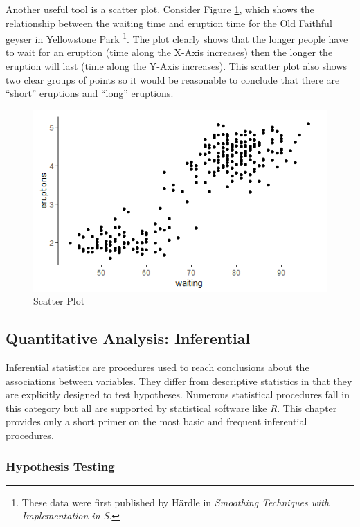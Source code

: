Another useful tool is a scatter plot. Consider Figure \ref{14:fig05}, which shows the relationship between the waiting time and eruption time for the Old Faithful geyser in Yellowstone Park \footnote{These data were first published by H{\"a}rdle in \textit{Smoothing Techniques with Implementation in S}\cite{hardle2012smoothing}.}. The plot clearly shows that the longer people have to wait for an eruption (time along the X-Axis increases) then the longer the eruption will last (time along the Y-Axis increases). This scatter plot also shows two clear groups of points so it would be reasonable to conclude that there are ``short'' eruptions and ``long'' eruptions.

\begin{figure}[H]
	\centering
	\includegraphics[width=\maxwidth{.95\linewidth}]{gfx/14-Faithful}
	\caption{Scatter Plot}
	\label{14:fig05}
\end{figure}

\subsection{Quantitative Analysis: Inferential}

Inferential statistics are procedures used to reach conclusions about the associations between variables. They differ from descriptive statistics in that they are explicitly designed to test hypotheses. Numerous statistical procedures fall in this category but all are supported by statistical software like \textit{R}. This chapter provides only a short primer on the most basic and frequent inferential procedures.

\subsubsection{Hypothesis Testing}

